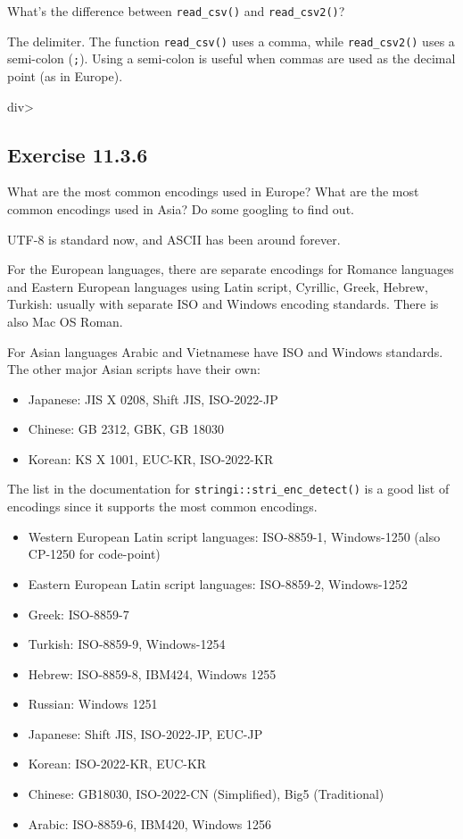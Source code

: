 \documentclass[]{book}
\providecommand{\tightlist}{%
  \setlength{\itemsep}{0pt}\setlength{\parskip}{0pt}}
\theoremstyle{plain}
\theoremstyle{remark}
\theoremstyle{definition}
\theoremstyle{definition}
\theoremstyle{definition}
\theoremstyle{remark}
\begin{document}
What's the difference between \texttt{read\_csv()} and
\texttt{read\_csv2()}?

The delimiter. The function \texttt{read\_csv()} uses a comma, while
\texttt{read\_csv2()} uses a semi-colon (\texttt{;}). Using a semi-colon
is useful when commas are used as the decimal point (as in Europe).

div\textgreater{}

\hypertarget{exercise-11.3.6}{%
\subsection*{\texorpdfstring{Exercise
{11.3.6}}{Exercise 11.3.6}}\label{exercise-11.3.6}}

What are the most common encodings used in Europe? What are the most
common encodings used in Asia? Do some googling to find out.

UTF-8 is standard now, and ASCII has been around forever.

For the European languages, there are separate encodings for Romance
languages and Eastern European languages using Latin script, Cyrillic,
Greek, Hebrew, Turkish: usually with separate ISO and Windows encoding
standards. There is also Mac OS Roman.

For Asian languages Arabic and Vietnamese have ISO and Windows
standards. The other major Asian scripts have their own:

\begin{itemize}
\tightlist
\item
  Japanese: JIS X 0208, Shift JIS, ISO-2022-JP
\item
  Chinese: GB 2312, GBK, GB 18030
\item
  Korean: KS X 1001, EUC-KR, ISO-2022-KR
\end{itemize}

The list in the documentation for \texttt{stringi::stri\_enc\_detect()}
is a good list of encodings since it supports the most common encodings.

\begin{itemize}
\tightlist
\item
  Western European Latin script languages: ISO-8859-1, Windows-1250
  (also CP-1250 for code-point)
\item
  Eastern European Latin script languages: ISO-8859-2, Windows-1252
\item
  Greek: ISO-8859-7
\item
  Turkish: ISO-8859-9, Windows-1254
\item
  Hebrew: ISO-8859-8, IBM424, Windows 1255
\item
  Russian: Windows 1251
\item
  Japanese: Shift JIS, ISO-2022-JP, EUC-JP
\item
  Korean: ISO-2022-KR, EUC-KR
\item
  Chinese: GB18030, ISO-2022-CN (Simplified), Big5 (Traditional)
\item
  Arabic: ISO-8859-6, IBM420, Windows 1256
\end{itemize}
\end{document}

